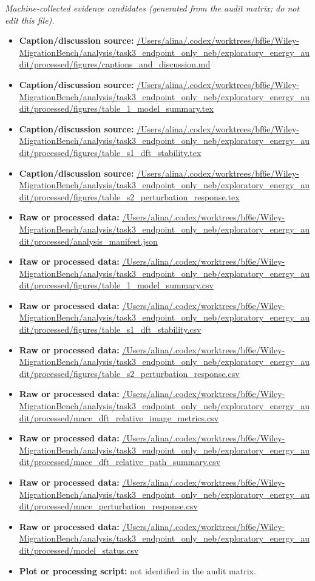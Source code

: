 \emph{Machine-collected evidence candidates (generated from the audit matrix; do not edit this file).}
\begin{itemize}[leftmargin=1.4em,noitemsep]
\item \textbf{Caption/discussion source:} \url{/Users/alina/.codex/worktrees/bf6e/Wiley-MigrationBench/analysis/task3_endpoint_only_neb/exploratory_energy_audit/processed/figures/captions_and_discussion.md}
\item \textbf{Caption/discussion source:} \url{/Users/alina/.codex/worktrees/bf6e/Wiley-MigrationBench/analysis/task3_endpoint_only_neb/exploratory_energy_audit/processed/figures/table_1_model_summary.tex}
\item \textbf{Caption/discussion source:} \url{/Users/alina/.codex/worktrees/bf6e/Wiley-MigrationBench/analysis/task3_endpoint_only_neb/exploratory_energy_audit/processed/figures/table_s1_dft_stability.tex}
\item \textbf{Caption/discussion source:} \url{/Users/alina/.codex/worktrees/bf6e/Wiley-MigrationBench/analysis/task3_endpoint_only_neb/exploratory_energy_audit/processed/figures/table_s2_perturbation_response.tex}
\item \textbf{Raw or processed data:} \url{/Users/alina/.codex/worktrees/bf6e/Wiley-MigrationBench/analysis/task3_endpoint_only_neb/exploratory_energy_audit/processed/analysis_manifest.json}
\item \textbf{Raw or processed data:} \url{/Users/alina/.codex/worktrees/bf6e/Wiley-MigrationBench/analysis/task3_endpoint_only_neb/exploratory_energy_audit/processed/figures/table_1_model_summary.csv}
\item \textbf{Raw or processed data:} \url{/Users/alina/.codex/worktrees/bf6e/Wiley-MigrationBench/analysis/task3_endpoint_only_neb/exploratory_energy_audit/processed/figures/table_s1_dft_stability.csv}
\item \textbf{Raw or processed data:} \url{/Users/alina/.codex/worktrees/bf6e/Wiley-MigrationBench/analysis/task3_endpoint_only_neb/exploratory_energy_audit/processed/figures/table_s2_perturbation_response.csv}
\item \textbf{Raw or processed data:} \url{/Users/alina/.codex/worktrees/bf6e/Wiley-MigrationBench/analysis/task3_endpoint_only_neb/exploratory_energy_audit/processed/mace_dft_relative_image_metrics.csv}
\item \textbf{Raw or processed data:} \url{/Users/alina/.codex/worktrees/bf6e/Wiley-MigrationBench/analysis/task3_endpoint_only_neb/exploratory_energy_audit/processed/mace_dft_relative_path_summary.csv}
\item \textbf{Raw or processed data:} \url{/Users/alina/.codex/worktrees/bf6e/Wiley-MigrationBench/analysis/task3_endpoint_only_neb/exploratory_energy_audit/processed/mace_perturbation_response.csv}
\item \textbf{Raw or processed data:} \url{/Users/alina/.codex/worktrees/bf6e/Wiley-MigrationBench/analysis/task3_endpoint_only_neb/exploratory_energy_audit/processed/model_status.csv}
\item \textbf{Plot or processing script:} not identified in the audit matrix.
\end{itemize}
